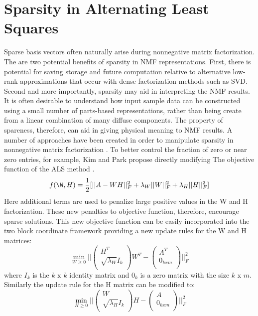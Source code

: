 \documentclass[final,leqno,onefignum,onetabnum]{siamltex1213}
\begin{document}
\section{Sparsity in Alternating Least Squares} Sparse basis vectors often naturally arise during nonnegative matrix factorization. The are two potential benefits of sparsity in NMF representations. First, there is potential for saving storage and future computation relative to alternative low-rank approximations that occur with dense factorization methods such as SVD. Second and more importantly, sparsity may aid in interpreting the NMF results. It is often desirable to understand how input sample data can be constructed using a small number of parts-based representations, rather than being create from a linear combination of many diffuse components. The property of spareness, therefore, can aid in giving physical meaning to NMF results. A number of approaches have been created in order to manipulate sparsity in nonnegative matrix factorization \cite{Li, Kim1, Kim2}. To better control the fraction of zero or near zero entries, for example, Kim and Park propose directly modifying The objective function of the ALS method \cite{Kim2}. 
\begin{equation}\label{ObjSpar}
 f( \W,H) = \frac{1}{2} [|| A - WH ||^{2}_{F} + \lambda_W || W ||^{2}_{F} + \lambda_H || H ||^{2}_{F} ]
\end{equation}
Here additional terms are used to penalize large positive values in the W and H factorization. These new penalties to objective function, therefore, encourage sparse solutions. This new objective function can be easily incorporated into the two block coordinate framework providing a new update rules for the W and H matrices:
\begin{equation}
    \min_{W \ge 0} || \left( \begin{array}{c} H^T   \\  \sqrt{\lambda_W}I_k \\ \end{array} \right) W^T- \left( \begin{array}{c} A^T   \\  0_{kxm} \\ \end{array} \right) ||^{2}_{F} 
\end{equation}
where $I_k$ is the $k\text{ x }k$ identity matrix and  $0_k$ is a zero matrix with the size $k\text{ x }m$. Similarly the update rule for the H matrix can be modified to: 
\begin{equation}
    \min_{H \ge 0} || \left( \begin{array}{c} W   \\  \sqrt{\lambda_H}I_k \\ \end{array} \right) H- \left( \begin{array}{c} A   \\  0_{kxm} \\ \end{array} \right) ||^{2}_{F} 
\end{equation}
\end{document}
